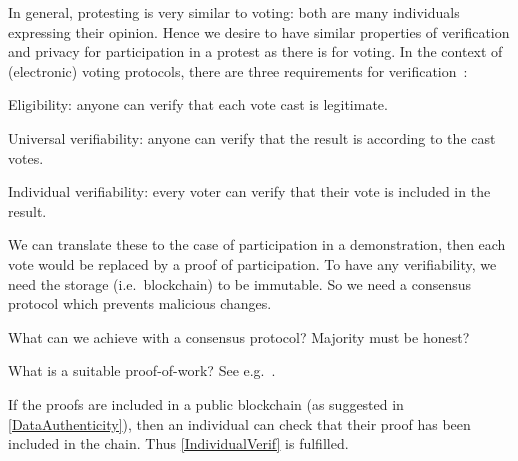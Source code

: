 In general, protesting is very similar to voting: both are many individuals 
expressing their opinion.
Hence we desire to have similar properties of verification and privacy for 
participation in a protest as there is for voting.
In the context of (electronic) voting protocols, there are three requirements 
for verification~\cite{VerifyingPrivacyPropertiesOfVotingProtocols}:
\begin{frame}
\begin{requirements}[V]
\item\label{EligibilityVerif} Eligibility: anyone can verify that each vote 
  cast is legitimate.
\item\label{UniversalVerif} Universal verifiability: anyone can verify that the 
  result is according to the cast votes.
\item\label{IndividualVerif} Individual verifiability: every voter can verify 
  that their vote is included in the result.
\end{requirements}
\end{frame}
We can translate these to the case of participation in a demonstration, then 
each vote would be replaced by a proof of participation.
To have any verifiability, we need the storage (i.e.\ blockchain) to be 
immutable.
So we need a consensus protocol which prevents malicious changes.

\begin{frame}

  \begin{question}
    What can we achieve with a consensus protocol?
    Majority must be honest?
  \end{question}
  \begin{question}
    What is a suitable proof-of-work?
    See e.g.~\cite{FairProofOfWork}.
  \end{question}
\end{frame}

If the proofs are included in a public blockchain (as suggested in 
\cref{DataAuthenticity}), then an individual can check that their proof has 
been included in the chain.
Thus \cref{IndividualVerif} is fulfilled.


